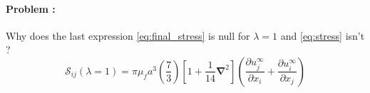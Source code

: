 \documentclass[12pt]{My_preprint}
\newcommand{\grad}{\mathbf{\nabla}}
\renewcommand{\ref}[1]{\autoref{#1}}
\begin{document}
\paragraph*{Problem : }
Why does the last expression \ref{eq:final_stress} is null for $\lambda=1$ and \ref{eq:stress} isn't ?
\begin{equation}
    \label{eq:stress}
    \mathscr{S}_{ij}(\lambda=1)
    =\pi \mu_f a^3 \left(
        \frac{7}{3}
    \right)
    \left[
        1+\frac{1}{14}\grad^2
    \right]
    \left(
        \frac{\partial u^\infty_j}{\partial x_i}
        + \frac{\partial u^\infty_i}{\partial x_j}
    \right)
\end{equation}

\end{document}
